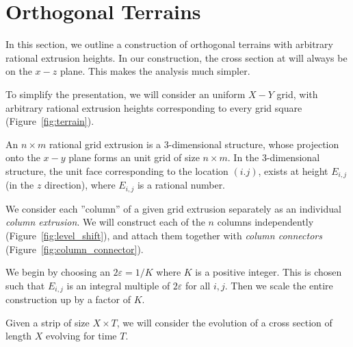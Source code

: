 \section{Orthogonal Terrains}
\label{sec:orthogonal_terrains}

In this section, we outline a construction of orthogonal terrains with arbitrary rational extrusion heights.
In our construction, the cross section at will always be on the $x-z$ plane.
This makes the analysis much simpler.
\graphicspath{{./figures/}}
\begin{figure}[!htb]
    \centering
    \caption{}
\end{figure}%

To simplify the presentation, we will consider an uniform $X-Y$ grid,
with arbitrary rational extrusion heights corresponding to every grid square (Figure~\ref{fig:terrain}).
\begin{definition}
An $n\times m$ rational grid extrusion is a 3-dimensional structure,
whose projection onto the $x-y$ plane forms an unit grid of size $n\times m$.
In the 3-dimensional structure, the unit face corresponding to the location $(i.j)$,
exists at height $E_{i,j}$ (in the $z$ direction), where $E_{i,j}$ is a rational number.
\end{definition}

We consider each ''column'' of a given grid extrusion separately as an individual \emph{column extrusion}.
We will construct each of the $n$ columns independently (Figure~\ref{fig:level_shift}),
and attach them together with \emph{column connectors} (Figure~\ref{fig:column_connector}).

We begin by choosing an $2\varepsilon=1/K$ where $K$ is a positive integer.
This is chosen such that $E_{i,j}$ is an integral multiple of $2\varepsilon$ for all $i,j$.
Then we scale the entire construction up by a factor of $K$.

Given a strip of size $X\times T$, we will consider the evolution of a cross section of length $X$ evolving for time $T$.




